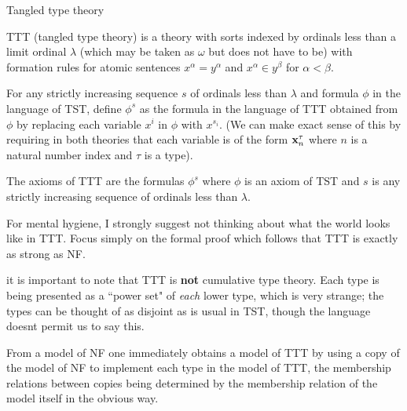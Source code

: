 \documentclass{slides}
\begin{document}
\begin{slide}

{\Large Tangled type theory}

TTT (tangled type theory) is a theory with sorts indexed by ordinals less than a limit ordinal $\lambda$ (which may be taken as $\omega$ but does not have to be) with formation rules
for atomic sentences $x^{\alpha} = y^{\alpha}$ and $x^{\alpha} \in y^{\beta}$ for $\alpha<\beta$.

For any strictly increasing sequence $s$ of ordinals less than $\lambda$ and formula $\phi$ in the language of TST, define $\phi^s$ as the formula in the language of TTT obtained from $\phi$ by replacing each variable $x^i$ in $\phi$ with $x^{s_i}$. (We can make exact sense of this by requiring in both theories that each variable is of the form ${\bf x}_n^{\tau}$ where $n$ is a natural number index and $\tau$ is a type).

The axioms of TTT are the formulas $\phi^s$ where $\phi$ is an axiom of TST and $s$ is any strictly increasing sequence of ordinals less than $\lambda$.

\end{slide}

\begin{slide}

For mental hygiene, I strongly suggest not thinking about what the world looks like in TTT.  Focus simply on the formal proof which follows that TTT is exactly as strong as NF.

it is important to note that TTT is {\bf not} cumulative type theory.  Each type is being presented as a ``power set" of {\em each} lower type, which is very strange;  the types can be thought of as disjoint as is usual in TST, though the language doesnt permit us to say this.

\end{slide}

\begin{slide}

From a model of NF one immediately obtains a model of TTT by using a copy of the model of NF to implement each type in the model of TTT, the membership relations between copies being determined by the membership relation of the model itself in the obvious way.

\end{slide}
\end{document}
